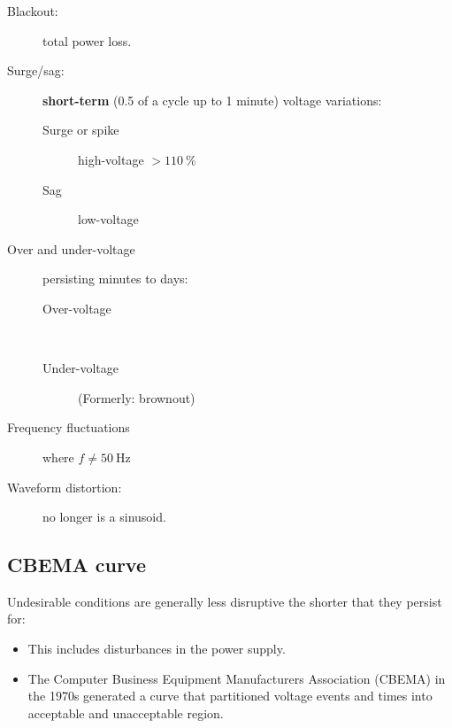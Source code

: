 \documentclass{pgslides}
\begin{document}
\begin{frame}{\insertsubsectionhead}
\begin{description}
\item[Blackout:] total power loss.
\item[Surge/sag:] \textbf{short-term} (0.5 of a cycle up to 1 minute) voltage variations:
\begin{description}
\item[Surge or spike] high-voltage $>\SI{110}{\percent}$
\item[Sag] low-voltage
\end{description}

\item[Over and under-voltage] persisting minutes to days:
\begin{description}
\item[Over-voltage] ~
\item[Under-voltage] (Formerly: brownout)
\end{description}

\item[Frequency fluctuations] where $f \ne \SI{50}{\hertz}$ 

\item[Waveform distortion:] no longer is a sinusoid.

\end{description}
\end{frame}

\subsection{CBEMA curve}

\begin{frame}{\insertsubsectionhead}
  
  Undesirable conditions are generally less disruptive the shorter that they persist for:
  \begin{itemize}
  \item
    This includes disturbances in the power supply.
  \item 
    The Computer Business Equipment Manufacturers Association (CBEMA) in the 1970s generated a curve that partitioned voltage events and times into acceptable and unacceptable region.
  \end{itemize}
    
\end{frame}

%
\end{document}
